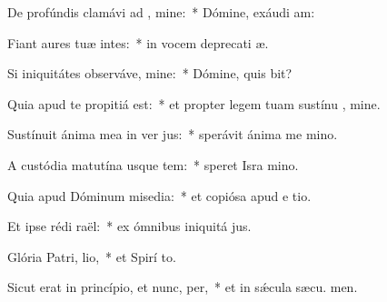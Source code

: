 \item De profúndis clamávi ad , mine:~* Dómine, exáudi  am:
\item Fiant aures tuæ intes:~* in vocem deprecati æ.
\item Si iniquitátes observáve, mine:~* Dómine, quis bit?
\item Quia apud te propitiá est:~* et propter legem tuam sustínu , mine.
\item Sustínuit ánima mea in ver jus:~* sperávit ánima me  mino.
\item A custódia matutína usque  tem:~* speret Isra  mino.
\item Quia apud Dóminum misedia:~* et copiósa apud e tio.
\item Et ipse rédi raël:~* ex ómnibus iniquitá jus.
\item Glória Patri,  lio,~* et Spirí to.
\item Sicut erat in princípio, et nunc,  per,~* et in sǽcula sæcu. men.
